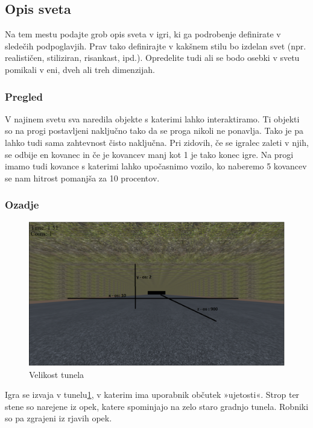 \documentclass[a4paper]{article}
\begin{document}
\subsection{Opis sveta}
Na tem mestu podajte grob opis sveta v igri, ki ga podrobenje definirate v sledečih podpoglavjih. Prav tako definirajte v kakšnem stilu bo izdelan svet (npr. realističen, stiliziran, risankast, ipd.). Opredelite tudi ali se bodo osebki v svetu pomikali v eni, dveh ali treh dimenzijah.

\subsubsection{Pregled}

V najinem svetu sva naredila objekte s katerimi lahko interaktiramo. Ti objekti so na progi postavljeni naključno tako da se proga nikoli ne ponavlja. Tako je pa lahko tudi sama zahtevnost čisto naključna. Pri zidovih, če se igralec zaleti v njih, se odbije en kovanec in če je kovancev manj kot 1 je tako konec igre. Na progi imamo tudi kovance s katerimi lahko upočasnimo vozilo, ko naberemo 5 kovancev se nam hitrost pomanjša za 10 procentov. 

\subsubsection{Ozadje}
\begin{figure}[!htb]
	\begin{center}
		\includegraphics[width=\columnwidth]{tunel.png}
		\caption{Velikost tunela} \label{fig:tunel}
	\end{center}
\end{figure}
Igra se izvaja v tunelu\ref{fig:tunel}, v katerim ima uporabnik občutek »ujetosti«.  Strop ter stene so narejene iz opek, katere spominjajo na zelo staro gradnjo tunela. Robniki so pa zgrajeni iz rjavih opek. 
\end{document}
